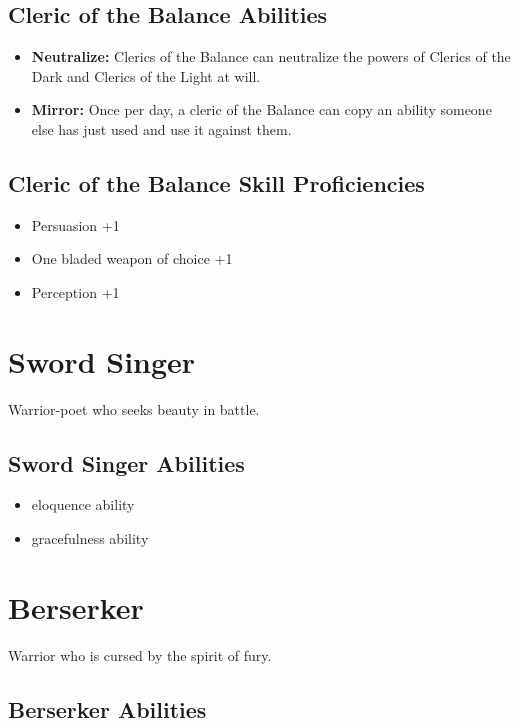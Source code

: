\begin{multicols}{2}
\subsection{Cleric of the Balance Abilities}

\begin{itemize}
    \item \textbf{Neutralize:} Clerics of the Balance can neutralize the powers of
    Clerics of the Dark and Clerics of the Light at will.
    \item \textbf{Mirror:} Once per day, a cleric of the Balance can copy an ability
    someone else has just used and use it against them.
\end{itemize}

\subsection{Cleric of the Balance Skill Proficiencies}

\begin{itemize}
    \item Persuasion +1
    \item One bladed weapon of choice +1
    \item Perception +1
\end{itemize}

\section{Sword Singer}

Warrior-poet who seeks beauty in battle.

\subsection{Sword Singer Abilities}

\begin{itemize}
    \item eloquence ability
    \item gracefulness ability
\end{itemize}

\section{Berserker}

Warrior who is cursed by the spirit of fury.

\subsection{Berserker Abilities}


\end{multicols}
